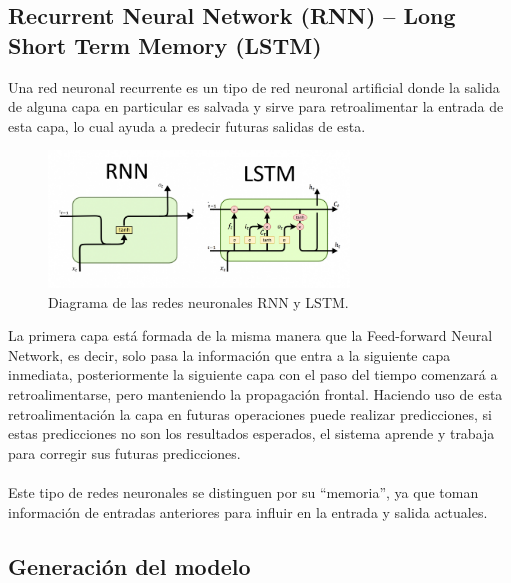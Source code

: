 \subsection{Recurrent Neural Network (RNN) – Long Short Term Memory (LSTM)}
Una red neuronal recurrente es un tipo de red neuronal artificial donde la salida de alguna capa en particular es salvada y sirve para retroalimentar la entrada de esta capa, lo cual ayuda a predecir futuras salidas de esta.
\begin{figure}[h]
	\centering
	\includegraphics[width=8cm]{figuras/RnnLstm.png}
	\caption{Diagrama de las redes neuronales RNN y LSTM.}
	\label{fig:Diagrama de las redes neuronales RNN y LSTM}
\end{figure}
La primera capa está formada de la misma manera que la Feed-forward Neural Network, es decir, solo pasa la información que entra a la siguiente capa inmediata, posteriormente la siguiente capa con el paso del tiempo comenzará a retroalimentarse, pero manteniendo la propagación frontal. Haciendo uso de esta retroalimentación la capa en futuras operaciones puede realizar predicciones, si estas predicciones no son los resultados esperados, el sistema aprende y trabaja para corregir sus futuras predicciones.\cite{redneurnn}\\\\
Este tipo de redes neuronales se distinguen por su “memoria”, ya que toman información de entradas anteriores para influir en la entrada y salida actuales.

\subsection{Generación del modelo}

